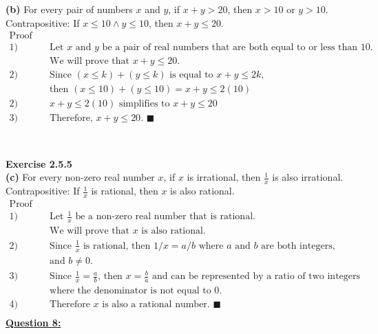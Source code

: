 \documentclass[12pt, letterpaper, twoside]{article}
\begin{document}
\newpage
\noindent \textbf{(b)} For every pair of numbers $x$ and $y$, if $x + y > 20$, then $x > 10$ or $y > 10$.\\
\break
Contrapositive: If $x \leq 10 \land y \leq 10$, then $x + y \leq 20$.
\begin{align*}
\text{Proof} &\\
1) & \quad \text{Let $x$ and $y$ be a pair of real numbers that are both equal to or less than 10.}\\
   & \quad \text{We will prove that $x + y \leq 20$.}\\
2) & \quad \text{Since $(x \leq k) + (y \leq k)$ is equal to $x + y \leq 2k$,}\\
   & \quad \text{then $(x \leq 10) + (y \leq 10) = x + y \leq 2(10)$}\\
2) & \quad \text{$x + y \leq 2(10)$ simplifies to $x + y \leq 20$}\\  
3) & \quad \text{Therefore, $x + y \leq 20$. } \blacksquare\\
\end{align*}\\\\
\noindent \textbf{Exercise 2.5.5}\\
\textbf{(c)} For every non-zero real number $x$, if $x$ is irrational, then $\frac{1}{x}$ is also irrational.\\
\break
Contrapositive: If $\frac{1}{x}$ is rational, then $x$ is also rational.\\
\begin{align*}
\text{Proof} &\\
1)  & \quad \text{Let $\frac{1}{x}$ be a non-zero real number that is rational.}\\
    & \quad \text{We will prove that $x$ is also rational.}\\
2)  & \quad \text{Since $\frac{1}{x}$ is rational, then $1/x = a/b$ where $a$ and $b$ are both integers,}\\
    & \quad \text{and $b \neq 0$.}\\
3)  & \quad \text{Since $\frac{1}{x} = \frac{a}{b}$, then $x = \frac{b}{a}$ and can be represented by a ratio of two integers}\\
    & \quad \text{where the denominator is not equal to 0.}\\
4)  & \quad \text{Therefore $x$ is also a rational number. } \blacksquare\\
\end{align*}
\newpage
\noindent \textbf{\underline{Question 8:}}\\
\end{document}
